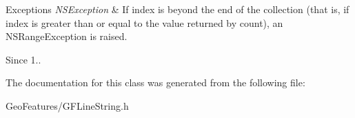 \begin{DoxyExceptions}{Exceptions}
{\em N\+S\+Exception} & If index is beyond the end of the collection (that is, if index is greater than or equal to the value returned by count), an N\+S\+Range\+Exception is raised.\\
\hline
\end{DoxyExceptions}
\begin{DoxySince}{Since}
1.. 
\end{DoxySince}


The documentation for this class was generated from the following file\+:\begin{DoxyCompactItemize}
\item 
Geo\+Features/G\+F\+Line\+String.\+h\end{DoxyCompactItemize}
